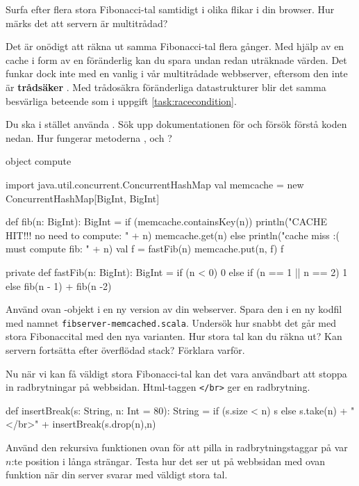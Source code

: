 \Subtask Surfa efter flera stora Fibonacci-tal samtidigt i olika flikar i din browser. Hur märks det att servern är multitrådad?


\Subtask Det är onödigt att räkna ut samma Fibonacci-tal flera gånger. Med hjälp av en cache i form av en föränderlig  kan du spara undan redan uträknade värden. Det funkar dock inte med en vanlig  i vår multitrådade webbserver, eftersom den inte är \textbf{trådsäker} . Med trådosäkra föränderliga datastrukturer blir det samma besvärliga beteende som i uppgift \ref{task:racecondition}.

Du ska i stället använda . Sök upp  dokumentationen för  och försök förstå koden nedan. Hur fungerar metoderna ,  och ?
\begin{Code}
object compute {
  import java.util.concurrent.ConcurrentHashMap
  val memcache = new ConcurrentHashMap[BigInt, BigInt]

  def fib(n: BigInt): BigInt = 
    if (memcache.containsKey(n)) { 
      println("CACHE HIT!!! no need to compute: " + n)
      memcache.get(n)
    } else {
      println("cache miss :( must compute fib:  " + n)
      val f = fastFib(n)
      memcache.put(n, f)
      f
    }

  private def fastFib(n: BigInt): BigInt = {
    if (n < 0) 0 else 
    if (n == 1 || n == 2) 1  
    else fib(n - 1) + fib(n -2)
  }
}
\end{Code}
 
\Subtask Använd ovan -objekt i en ny version av din webserver. Spara den i en ny kodfil med namnet \texttt{fibserver-memcached.scala}. Undersök hur snabbt det går med stora Fibonaccital med den nya varianten. Hur stora tal kan du räkna ut? Kan servern fortsätta efter överflödad stack? Förklara varför.

\Subtask Nu när vi kan få väldigt stora Fibonacci-tal kan det vara användbart att stoppa in radbrytningar på webbsidan. Html-taggen \texttt{</br>} ger en radbrytning. 
\begin{Code}
  def insertBreak(s: String, n: Int = 80): String = {
    if (s.size < n) s 
    else s.take(n) + "</br>" + insertBreak(s.drop(n),n)
  }
\end{Code}
Använd den rekursiva funktionen ovan för att pilla in radbrytningstaggar på var $n$:te position i långa strängar. Testa hur det ser ut på webbsidan med ovan funktion när din server svarar med väldigt stora tal.

